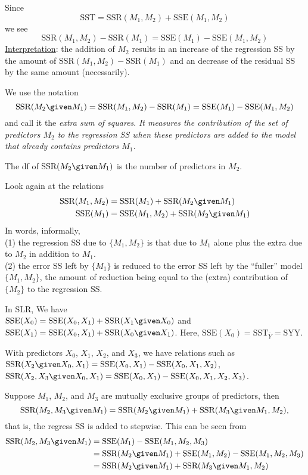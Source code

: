 \documentclass[12pt]{article}
\newcommand\SSE{\text{SSE}}
\newcommand\SST{\text{SST}}
\newcommand\SSR{\text{SSR}}
\begin{document}
Since
\[
\text{SST} = \text{SSR}(M_1, M_2) + \text{SSE}(M_1, M_2)
\]
we see
\[
\text{SSR}(M_1, M_2) - \text{SSR}(M_1)
= \text{SSE}(M_1) - \text{SSE}(M_1, M_2)
\]
\underline{Interpretation}:
the addition of $M_2$ results in an increase of the regression SS by
the amount of $\text{SSR}(M_1, M_2) - \text{SSR}(M_1)$
and an decrease of the residual SS by the same amount (necessarily).

 We use the notation
\[
\text{SSR}(M_2 \given M_1)
= \text{SSR}(M_1, M_2) - \text{SSR}(M_1)
= \text{SSE}(M_1) - \text{SSE}(M_1, M_2)
\]
and call it the \emph{extra sum of squares}.
\emph{It measures the contribution of the set of predictors $M_2$
to the regression SS when these predictors are added to the model
that already contains predictors $M_1$.}

The df of $\text{SSR}(M_2 \given M_1)$ is the number of predictors
in $M_2$.

Look again at the relations
\[\begin{split}
\text{SSR}(M_1, M_2)
&= \text{SSR}(M_1) + \text{SSR}(M_2 \given M_1)
\\
\text{SSE}(M_1)
&= \text{SSE}(M_1, M_2) + \text{SSR}(M_2 \given M_1)
\end{split}
\]
In words, informally,
\\
(1) the regression SS due to $\{M_1, M_2\}$
is that due to $M_1$ alone plus the extra due to $M_2$ in addition to
$M_1$.
\\
(2) the error SS left by $\{M_1\}$
is reduced to the error SS left by the ``fuller'' model $\{M_1, M_2\}$,
the amount of reduction being equal to the (extra) contribution
of $\{M_2\}$ to the regression SS.


\example
In SLR, We have\\
$\SSE(X_0) = \SSE(X_0, X_1) + \SSR(X_1 \given X_0)$ and\\
$\SSE(X_1) = \SSE(X_0, X_1) + \SSR(X_0 \given X_1)$.
Here,
$\SSE(X_0) = \SST_{\overline{Y}} = \text{SYY}$.

\example
With predictors $X_0$, $X_1$, $X_2$, and $X_3$,
we have relations such as\\
$\SSR(X_2 \given X_0, X_1) = \SSE(X_0, X_1) - \SSE(X_0, X_1, X_2)$,\\
$\SSR(X_2, X_3 \given X_0, X_1) = \SSE(X_0, X_1) - \SSE(X_0, X_1, X_2,
X_3)$.

\example
Suppose $M_1$, $M_2$, and $M_3$ are mutually exclusive groups of
predictors, then
\[
\SSR(M_2, M_3 \given M_1)
= \SSR(M_2 \given M_1) + \SSR(M_3 \given M_1, M_2)
,
\]
that is,
the regress SS is added to stepwise.
This can be seen from
\begin{align*}
\SSR(M_2, M_3 \given M_1)
&= \SSE(M_1) - \SSE(M_1, M_2, M_3)
\\
&= \SSR(M_2 \given M_1)
    + \SSE(M_1, M_2)
    - \SSE(M_1, M_2, M_3)
\\
&= \SSR(M_2 \given M_1)
    + \SSR(M_3 \given M_1, M_2)
\end{align*}
\end{document}
